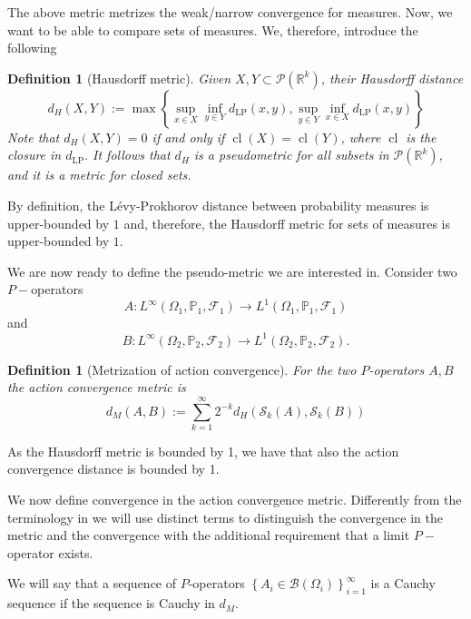 \documentclass[11pt]{article}
\newtheorem{definition}[theorem]{Definition}
\def\P{\mathbb{P}}
\begin{document}
The above metric metrizes the weak/narrow convergence for measures. \newline
Now, we want to be able to compare sets of measures. We, therefore, introduce the following

\begin{definition}[Hausdorff metric]\label{HausdorffDist}
 Given $X, Y\subset \mathcal{P}\left(\mathbb{R}^{k}\right)$, their \emph{Hausdorff distance} 
$$
d_{H}(X, Y):=\max \left\{\sup _{x \in X} \inf _{y \in Y} d_{\mathrm{LP}}(x, y), \sup _{y \in Y} \inf _{x \in X} d_{\mathrm{LP}}(x, y)\right\}
$$
Note that $d_{H}(X, Y)=0$ if and only if $\operatorname{cl}(X)=\operatorname{cl}(Y)$, where $\operatorname{cl}$ is the closure in $d_{\mathrm{LP}} .$ It follows that $d_{H}$ is a pseudometric for all subsets in $\mathcal{P}\left(\mathbb{R}^{k}\right)$, and it is a metric for closed sets.
\end{definition}
By definition, the Lévy-Prokhorov distance between probability measures is upper-bounded by $1$ and, therefore, the Hausdorff metric for sets of measures is upper-bounded by $1$.\newline

We are now ready to define the pseudo-metric we are interested in.
Consider two $P-$operators
$$
A: L^{\infty}(\Omega_1,\P_1,\mathcal{F}_1)\rightarrow L^1(\Omega_1,\P_1,\mathcal{F}_1)
$$and
$$
B: L^{\infty}(\Omega_2,\P_2,\mathcal{F}_2)\rightarrow L^1(\Omega_2,\P_2,\mathcal{F}_2).
$$
\begin{definition}[Metrization of action convergence] For the two $P$-operators $A, B$ the \emph{action convergence metric} is
$$
d_{M}(A, B):=\sum_{k=1}^{\infty} 2^{-k} d_{H}\left(\mathcal{S}_{k}(A), \mathcal{S}_{k}(B)\right)
$$
\end{definition}
As the Hausdorff metric is bounded by 1, we have that also the action convergence distance is bounded by 1.

We now define convergence in the action convergence metric. Differently from the terminology in \cite{backhausz2018action} we will use distinct terms to distinguish the convergence in the metric and the convergence with the additional requirement that a limit $P-$operator exists.\newline


We will say that a sequence of $P$-operators $\left\{A_i \in \mathcal{B}\left(\Omega_i\right)\right\}_{i=1}^{\infty}$ is a Cauchy sequence if the sequence is Cauchy in $d_M$. \newline
\end{document}
